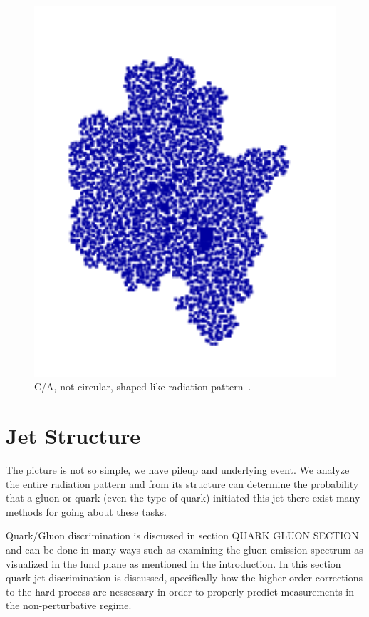 \begin{figure}[htb]
\centering
\includegraphics[width=1.0\textwidth]{visuals/figs_subjet-plots-CA.png}
\caption{C/A, not circular, shaped like radiation pattern~\cite{Dreyer:2018nbf}.}
\label{fig:lund}
\end{figure}



\section{Jet Structure}\label{jetstruc:ch1}

The picture is not so simple, we have pileup and underlying event. We analyze the entire radiation pattern and from its structure can determine the probability that a  gluon or quark (even the type of quark) initiated this jet there exist many methods for going about these tasks.

Quark/Gluon discrimination is discussed in section QUARK GLUON SECTION and can be done in many ways such as examining the gluon emission spectrum as visualized in the lund plane as mentioned in the introduction. In this section quark jet discrimination is discussed, specifically how the higher order corrections to the hard process are nessessary in order to properly predict measurements in the non-perturbative regime.


